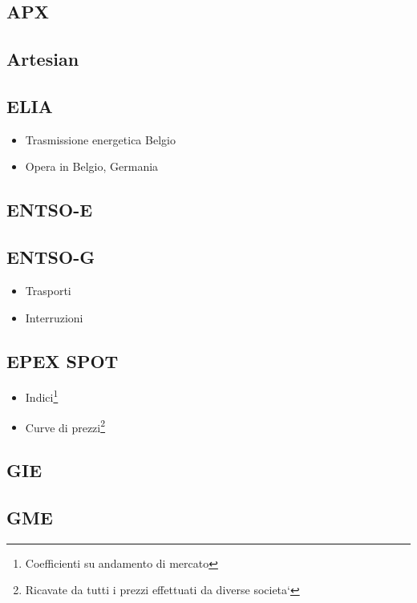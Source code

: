 \subsection{APX}
\subsection{Artesian}
    
\subsection{ELIA}
    \begin{itemize}
        \item Trasmissione energetica Belgio
        \item Opera in Belgio, Germania
    \end{itemize}
\subsection{ENTSO-E}
\subsection{ENTSO-G}
    \begin{itemize}
        \item Trasporti
        \item Interruzioni
    \end{itemize}
\subsection{EPEX SPOT}
    \begin{itemize}
        \item Indici\footnote{Coefficienti su andamento di mercato}
        \item Curve di prezzi\footnote{Ricavate da tutti i prezzi effettuati da diverse societa`}
    \end{itemize}
\subsection{GIE}
\subsection{GME}
    
